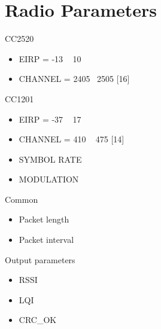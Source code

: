\documentclass{article}
\begin{document}
\section{Radio Parameters}
CC2520
\begin{itemize}
	\item EIRP = -13 ~ 10
	\item CHANNEL = 2405 ~2505 [16]
\end{itemize}
CC1201
\begin{itemize}
	\item EIRP = -37 ~ 17
	\item CHANNEL = 410 ~ 475 [14]
	\item SYMBOL RATE
	\item MODULATION
\end{itemize}
Common
\begin{itemize}
	\item Packet length
	\item Packet interval
\end{itemize}
Output parameters
\begin{itemize}
	\item RSSI
	\item LQI
	\item CRC\_OK
\end{itemize}
\clearpage



\end{document}
